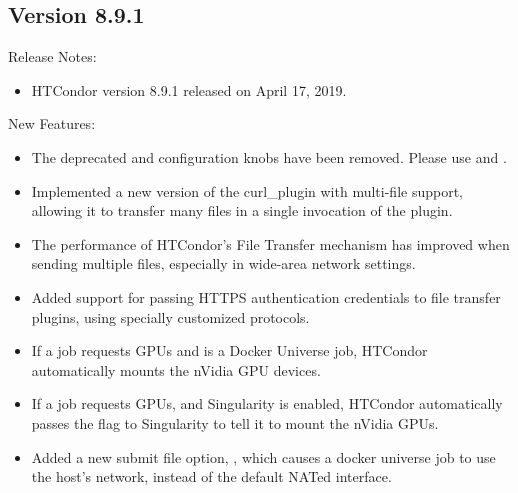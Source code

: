 \subsection*{\label{sec:New-8-9-1}Version 8.9.1}

\noindent Release Notes:

\begin{itemize}

\item HTCondor version 8.9.1 released on April 17, 2019.

\end{itemize}


\noindent New Features:

\begin{itemize}

\item The deprecated  and 
configuration knobs have been removed. Please use 
and .

\item Implemented a new version of the curl\_plugin with multi-file support,
allowing it to transfer many files in a single invocation of the plugin.
 

\item The performance of HTCondor's File Transfer mechanism has improved when
	sending multiple files, especially in wide-area network settings.

\item Added support for passing HTTPS authentication credentials to
file transfer plugins, using specially customized protocols.

\item If a job requests GPUs and is a Docker Universe job, HTCondor
automatically mounts the nVidia GPU devices.

\item If a job requests GPUs, and Singularity is enabled, HTCondor
automatically passes the  flag to Singularity to tell it to mount
the nVidia GPUs.

\item Added a new submit file option, ,
which causes a docker universe job to use the host's network,
instead of the default NATed interface.


\end{itemize}
